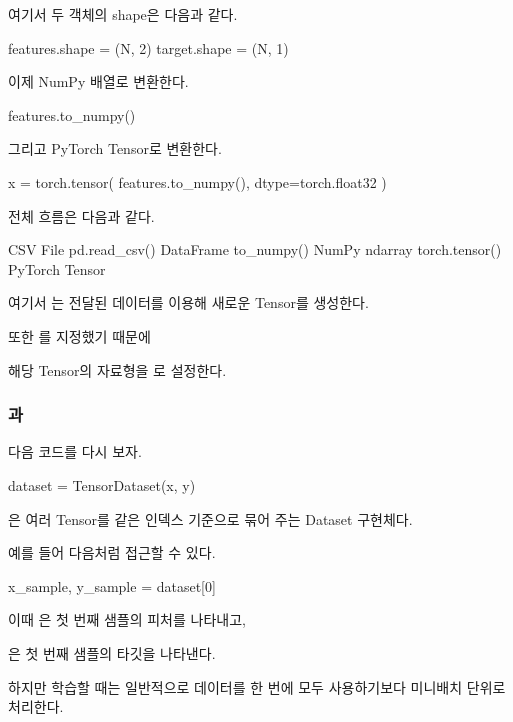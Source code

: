 여기서 두 객체의 shape은 다음과 같다.

\begin{dhkzsh}
features.shape = (N, 2)
target.shape   = (N, 1)
\end{dhkzsh}

이제 NumPy 배열로 변환한다.

\begin{dhkcode}
features.to_numpy()
\end{dhkcode}

그리고 PyTorch Tensor로 변환한다.

\begin{dhkcode}
x = torch.tensor(
    features.to_numpy(),
    dtype=torch.float32
)
\end{dhkcode}

전체 흐름은 다음과 같다.

\begin{dhksmry}[centered]
CSV File
\da
pd.read_csv()
\da
DataFrame
\da
to_numpy()
\da
NumPy ndarray
\da
torch.tensor()
\da
PyTorch Tensor
\end{dhksmry}

여기서 는 전달된 데이터를 이용해 새로운 Tensor를 생성한다.

또한 를 지정했기 때문에

해당 Tensor의 자료형을 로 설정한다.

\subsubsection{과 }

다음 코드를 다시 보자.

\begin{dhkcode}
dataset = TensorDataset(x, y)
\end{dhkcode}

은 여러 Tensor를 같은 인덱스 기준으로 묶어 주는 Dataset 구현체다.

예를 들어 다음처럼 접근할 수 있다.

\begin{dhkcode}
x_sample, y_sample = dataset[0]
\end{dhkcode}

이때 은 첫 번째 샘플의 피처를 나타내고,

은 첫 번째 샘플의 타깃을 나타낸다.

하지만 학습할 때는 일반적으로 데이터를 한 번에 모두 사용하기보다 미니배치 단위로 처리한다.

